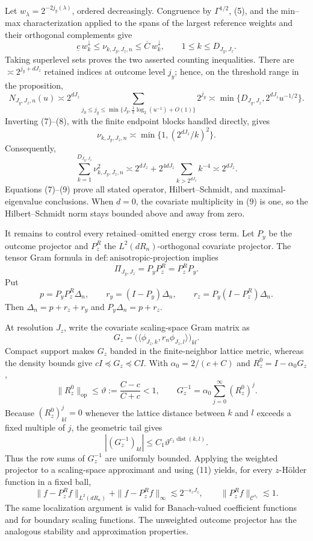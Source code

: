 Let \(w_\lambda=2^{-2j_y(\lambda)}\), ordered decreasingly.  Congruence by \(\Gamma^{1/2}\), (5), and the min--max characterization applied to the spans of the largest reference weights and their orthogonal complements give
\[
\underline c\,w_k^\downarrow\le\nu_{k,J_y,J_z,n}
\le\overline C\,w_k^\downarrow,
\qquad 1\le k\le D_{J_y,J_z}. \tag{7}
\]
Taking superlevel sets proves the two asserted counting inequalities.  There are \(\asymp2^{j_y+dJ_z}\) retained indices at outcome level \(j_y\); hence, on the threshold range in the proposition,
\[
N_{J_y,J_z,n}(u)
\asymp2^{dJ_z}\!\sum_{j_0\le j_y\le
\min\{J_y,\frac12\log_2(u^{-1})+O(1)\}}2^{j_y}
\asymp\min\{D_{J_y,J_z},2^{dJ_z}u^{-1/2}\}. \tag{8}
\]
Inverting (7)--(8), with the finite endpoint blocks handled directly, gives
\[
\nu_{k,J_y,J_z,n}\asymp\min\{1,(2^{dJ_z}/k)^2\}.
\]
Consequently,
\[
\sum_{k=1}^{D_{J_y,J_z}}\nu_{k,J_y,J_z,n}^2
\asymp2^{dJ_z}+2^{4dJ_z}\sum_{k>2^{dJ_z}}k^{-4}
\asymp2^{dJ_z}. \tag{9}
\]
Equations (7)--(9) prove all stated operator, Hilbert--Schmidt, and maximal-eigenvalue conclusions.  When \(d=0\), the covariate multiplicity in (9) is one, so the Hilbert--Schmidt norm stays bounded above and away from zero.

It remains to control every retained--omitted energy cross term.  Let \(P_y\) be the outcome projector and \(P_z^R\) the \(L^2(dR_n)\)-orthogonal covariate projector.  The tensor Gram formula in \(\mathrm{def{:}anisotropic\text{-}projection}\) implies
\[
\Pi_{J_y,J_z}=P_yP_z^R=P_z^RP_y. \tag{10}
\]
Put
\[
p=P_yP_z^R\Delta_n,
\qquad r_y=(I-P_y)\Delta_n,
\qquad r_z=P_y(I-P_z^R)\Delta_n.
\]
Then \(\Delta_n=p+r_z+r_y\) and \(P_y\Delta_n=p+r_z\).

At resolution \(J_z\), write the covariate scaling-space Gram matrix as
\[
G_z=\bigl(\langle\phi_{J_z,k},r_n\phi_{J_z,l}\rangle\bigr)_{kl}.
\]
Compact support makes \(G_z\) banded in the finite-neighbor lattice metric, whereas the density bounds give \(cI\preceq G_z\preceq CI\).  With \(\alpha_0=2/(c+C)\) and \(R_z^0=I-\alpha_0G_z\),
\[
\|R_z^0\|_{\mathrm{op}}\le\vartheta:=\frac{C-c}{C+c}<1,
\qquad
G_z^{-1}=\alpha_0\sum_{j=0}^{\infty}(R_z^0)^j.
\]
Because \((R_z^0)^j_{kl}=0\) whenever the lattice distance between \(k\) and \(l\) exceeds a fixed multiple of \(j\), the geometric tail gives
\[
|(G_z^{-1})_{kl}|\le C_1\vartheta^{c_1\operatorname{dist}(k,l)}. \tag{11}
\]
Thus the row sums of \(G_z^{-1}\) are uniformly bounded.  Applying the weighted projector to a scaling-space approximant and using (11) yields, for every \(z\)-H\"older function in a fixed ball,
\[
\|f-P_z^Rf\|_{L^2(dR_n)}+\|f-P_z^Rf\|_\infty
\lesssim2^{-s_zJ_z},
\qquad
\|P_z^Rf\|_{\mathcal C^{s_z}}\lesssim1. \tag{12}
\]
The same localization argument is valid for Banach-valued coefficient functions and for boundary scaling functions.  The unweighted outcome projector has the analogous stability and approximation properties.

